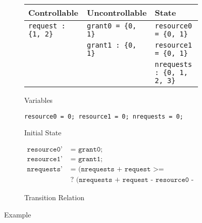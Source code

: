 \begin{figure}
    \begin{subfigure}[t]{\textwidth}
        \centering
        \begin{tabular}{l | l | l}
            \textbf{Controllable} & \textbf{Uncontrollable} & \textbf{State} \\
            \hline
            \texttt{request : \{1, 2\}} & \texttt{grant0 = \{0, 1\}} & \texttt{resource0 = \{0, 1\}} \\
            & \texttt{grant1 : \{0, 1\}} & \texttt{resource1 = \{0, 1\}} \\
            & & \texttt{nrequests : \{0, 1, 2, 3\}} \\
        \end{tabular}
        \caption{Variables}
        \label{fig:examplevars}
    \end{subfigure}

    \begin{subfigure}[t]{\textwidth}
        \centering
        \texttt{resource0 = 0; resource1 = 0; nrequests = 0;}
        \caption{Initial State}
        \label{fig:exampleinit}
    \end{subfigure}

    \begin{subfigure}[t]{\textwidth}
        \begin {align*}
            \texttt{resource0'} & \texttt{ = grant0;} \\
            \texttt{resource1'} & \texttt{ = grant1;} \\
            \texttt{nrequests'} & \texttt{ = (nrequests + request >= resource0 + resource1)} \\ 
                                & \texttt{ ? (nrequests + request - resource0 - resource1) : 0;}
        \end{align*}
        \caption{Transition Relation}
        \label{fig:exampletrans}
    \end{subfigure}
    \caption{Example}
    \label{fig:example}
\end{figure}



